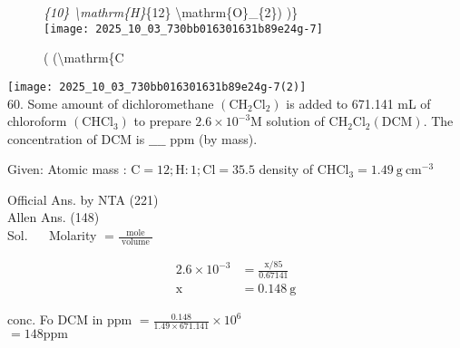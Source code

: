 \documentclass[10pt]{article}
\begin{document}
\begin{figure}[h]
\begin{center}
\captionsetup{labelformat=empty}
\caption{( (\textbackslash mathrm\{C}\textit{\{10\} \textbackslash mathrm\{H\}}\{12\} \textbackslash mathrm\{O\}\_\{2\}) )\}\\
  \texttt{[image: 2025\_10\_03\_730bb016301631b89e24g-7]}
\end{center}
\end{figure}

\texttt{[image: 2025\_10\_03\_730bb016301631b89e24g-7(2)]}\\
60. Some amount of dichloromethane \(\left(\mathrm{CH}_{2} \mathrm{Cl}_{2}\right)\) is added to 671.141 mL of chloroform \(\left(\mathrm{CHCl}_{3}\right)\) to prepare \(2.6 \times 10^{-3} \mathrm{M}\) solution of \(\mathrm{CH}_{2} \mathrm{Cl}_{2}(\mathrm{DCM})\). The concentration of DCM is \(\_\_\_\_\) ppm (by mass).

Given: Atomic mass : \(\mathrm{C}=12 ; \mathrm{H}: 1 ; \mathrm{Cl}=35.5\) density of \(\mathrm{CHCl}_{3}=1.49 \mathrm{~g} \mathrm{~cm}^{-3}\)

Official Ans. by NTA (221)\\
Allen Ans. (148)\\
Sol. \(\quad\) Molarity \(=\frac{\text { mole }}{\text { volume }}\)

\[
\begin{aligned}
2.6 \times 10^{-3} & =\frac{\mathrm{x} / 85}{0.67141} \\
\mathrm{x} & =0.148 \mathrm{~g}
\end{aligned}
\]

conc. Fo DCM in ppm \(=\frac{0.148}{1.49 \times 671.141} \times 10^{6}\)\\
\(=148 \mathrm{ppm}\)
\end{document}
